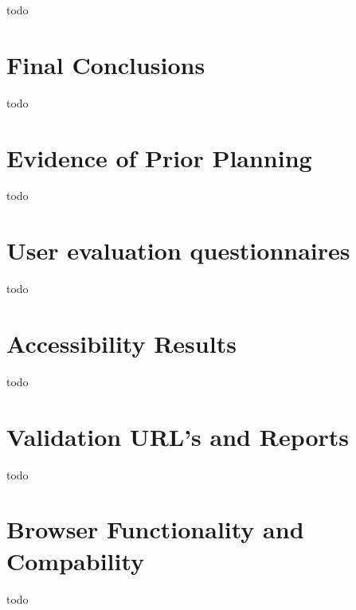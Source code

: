 \documentclass[letterpaper,12pt]{article}
\begin{document}
todo

\section{Final Conclusions}

todo


\begin{appendices}

\clearpage
\section{Evidence of Prior Planning}
todo

\clearpage
\section{User evaluation questionnaires}
todo

\clearpage
\section{Accessibility Results}
todo

\clearpage
\section{Validation URL's and Reports}
todo

\clearpage
\section{Browser Functionality and Compability}
todo

\newpage



\end{appendices}
\end{document}
